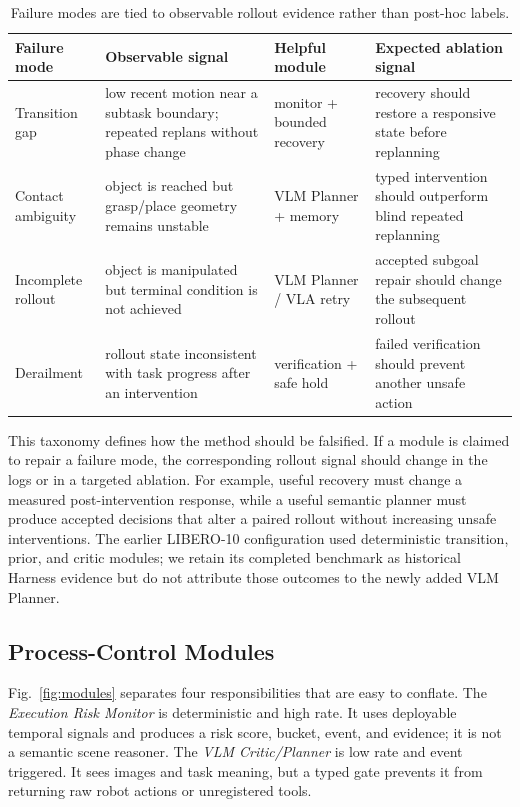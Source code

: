 \documentclass[runningheads]{waica}
\begin{document}
\begin{table}
\caption{Failure modes are tied to observable rollout evidence rather than post-hoc labels.}
\label{tab:taxonomy}
\centering
\small
\begin{tabularx}{\textwidth}{p{}p{}p{}X}
\toprule
Failure mode & Observable signal & Helpful module & Expected ablation signal \\
\midrule
Transition gap & low recent motion near a subtask boundary; repeated replans without phase change & monitor + bounded recovery & recovery should restore a responsive state before replanning \\
Contact ambiguity & object is reached but grasp/place geometry remains unstable & VLM Planner + memory & typed intervention should outperform blind repeated replanning \\
Incomplete rollout & object is manipulated but terminal condition is not achieved & VLM Planner / VLA retry & accepted subgoal repair should change the subsequent rollout \\
Derailment & rollout state inconsistent with task progress after an intervention & verification + safe hold & failed verification should prevent another unsafe action \\
\bottomrule
\end{tabularx}
\end{table}

This taxonomy defines how the method should be falsified.
If a module is claimed to repair a failure mode, the corresponding rollout signal should change in the logs or in a targeted ablation.
For example, useful recovery must change a measured post-intervention response,
while a useful semantic planner must produce accepted decisions that alter a
paired rollout without increasing unsafe interventions. The earlier LIBERO-10
configuration used deterministic transition, prior, and critic modules; we
retain its completed benchmark as historical Harness evidence but do not
attribute those outcomes to the newly added VLM Planner.

\subsection{Process-Control Modules}

Fig.~\ref{fig:modules} separates four responsibilities that are easy to
conflate. The \emph{Execution Risk Monitor} is deterministic and high rate. It
uses deployable temporal signals and produces a risk score, bucket, event, and
evidence; it is not a semantic scene reasoner. The \emph{VLM Critic/Planner} is
low rate and event triggered. It sees images and task meaning, but a typed gate
prevents it from returning raw robot actions or unregistered tools.
\end{document}
